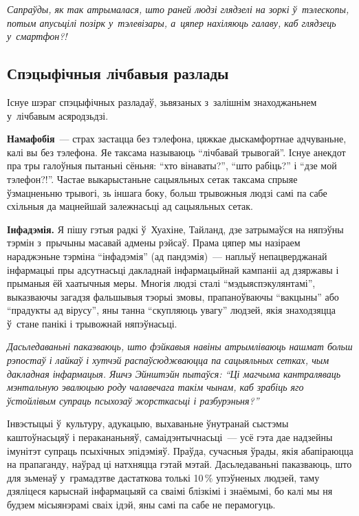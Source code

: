 \emph{Сапраўды, як так атрымалася, што раней людзі глядзелі на зоркі ў~тэлескопы, потым апусьцілі позірк у~тэлевізары, а~цяпер нахіляюць галаву, каб глядзець у~смартфон?!}

\subsection*{Спэцыфічныя лічбавыя разлады}

Існуе шэраг спэцыфічных разладаў, зьвязаных з~залішнім знаходжаньнем у~лічбавым асяродзьдзі.

\textbf{Намафобія}~--- страх застацца без тэлефона, цяжкае дыскамфортнае адчуваньне, калі вы без тэлефона. Яе таксама называюць ``лічбавай трывогай''. Існуе анекдот пра тры галоўныя пытаньні сёньня: ``хто вінаваты?'', ``што рабіць?'' і ``дзе мой тэлефон?!''. Частае выкарыстаньне сацыяльных сетак таксама спрыяе ўзмацненьню трывогі, зь іншага боку, больш трывожныя людзі самі па сабе схільныя да мацнейшай залежнасьці ад сацыяльных сетак.

\textbf{Інфадэмія.} Я пішу гэтыя радкі ў~Хуахіне, Тайланд, дзе затрымаўся на няпэўны тэрмін з~прычыны масавай адмены рэйсаў. Прама цяпер мы назіраем нараджэньне тэрміна ``інфадэмія'' (ад пандэмія)~--- наплыў непацверджанай інфармацыі пры адсутнасьці дакладнай інфармацыйнай кампаніі ад дзяржавы і прыманыя ёй хаатычныя меры. Многія людзі сталі ``мэдыяспэкулянтамі'', выказваючы загадзя фальшывыя тэорыі змовы, прапаноўваючы ``вакцыны'' або ``прадукты ад вірусу'', яны танна ``скупляюць увагу'' людзей, якія знаходзяцца ў~стане панікі і трывожнай няпэўнасьці.

\emph{Дасьледаваньні паказваюць, што фэйкавыя навіны атрымліваюць нашмат больш рэпостаў і лайкаў і хутчэй распаўсюджваюцца па сацыяльных сетках, чым дакладная інфармацыя. Яшчэ Эйнштэйн пытаўся: ``Ці магчыма кантраляваць мэнтальную эвалюцыю роду чалавечага такім чынам, каб зрабіць яго ўстойлівым супраць псыхозаў жорсткасьці і разбурэньня?''} 

Інвэстыцыі ў~культуру, адукацыю, выхаваньне ўнутранай сыстэмы каштоўнасьцяў і перакананьняў, самаідэнтычнасьці~--- усё гэта дае надзейны імунітэт супраць псыхічных эпідэміяў. Праўда, сучасныя ўрады, якія абапіраюцца на прапаганду, наўрад ці натхняцца гэтай мэтай. Дасьледаваньні паказваюць, што для зьменаў у~грамадзтве дастаткова толькі 10\,\% упэўненых людзей, таму дзяліцеся карыснай інфармацыяй са сваімі блізкімі і знаёмымі, бо калі мы ня будзем місыянэрамі сваіх ідэй, яны самі па сабе не перамогуць.


